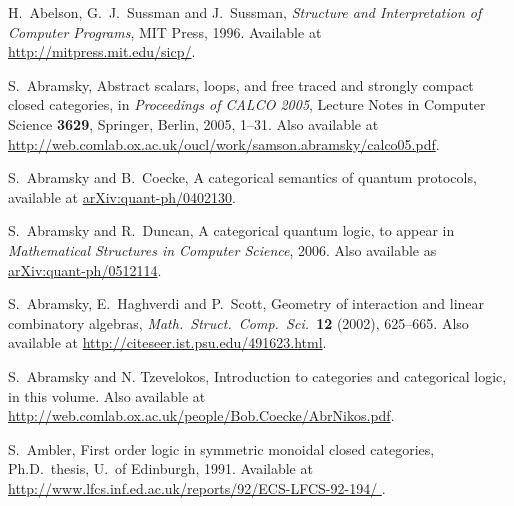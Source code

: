 \documentclass[12pt]{article}
\begin{document}
\begin{thebibliography}{99}
\raggedright
\newcommand{\quantph}[1]{\href{http://arxiv.org/abs/quant-ph/#1}{{ arXiv:quant-ph/#1}}}
\newcommand{\hepth}[1]{\href{http://arxiv.org/abs/hep-th/#1}{{ arXiv:hep-th/#1}}}
\newcommand{\grqc}[1]{\href{http://arxiv.org/abs/gr-qc/#1}{{ arXiv:gr-qc/#1}}}
\newcommand{\qalg}[1]{\href{http://arxiv.org/abs/q-alg/#1}{{ arXiv:q-alg/#1}}}
\newcommand{\mathph}[1]{\href{http://arxiv.org/abs/math-ph/#1}{{ arXiv:math-ph/#1}}}
\newcommand{\Math}[1]{\href{http://arxiv.org/abs/math/#1}{{ arXiv:math/#1}}}
\newcommand{\arxiv}[1]{\href{http://arxiv.org/abs/#1}{{ arXiv:#1}}}

 H.\ Abelson, G.\ J.\ Sussman and J.\
Sussman, {\sl Structure and Interpretation of Computer Programs},
MIT Press, 1996.  Available at \href{http://mitpress.mit.edu/sicp/}{{ http://mitpress.mit.edu/sicp/}}.

S.\ Abramsky, Abstract scalars, loops, and free traced and strongly 
compact closed categories, in {\sl Proceedings of CALCO 2005}, 
Lecture Notes in Computer Science {\bf 3629}, Springer, Berlin,
2005, 1--31. Also available at \hfill \break 
\href{http://web.comlab.ox.ac.uk/oucl/work/samson.abramsky/calco05.pdf}{ http://web.comlab.ox.ac.uk/oucl/work/samson.abramsky/calco05.pdf}.

 S.\ Abramsky and B.\ Coecke, A categorical semantics of
quantum protocols, available at \quantph{0402130}.

S.\ Abramsky and R.\ Duncan, A categorical quantum logic, to appear 
in {\sl Mathematical Structures in Computer Science}, 2006.
Also available as \quantph{0512114}.

 S.\ Abramsky, E.\ Haghverdi and P.\ Scott,
Geometry of interaction and linear combinatory algebras, 
{\sl Math.\ Struct.\ Comp.\ Sci.\ }{\bf 12} (2002), 625--665.  Also
available at \hfill \break
\href{http://citeseer.ist.psu.edu/491623.html}{ http://citeseer.ist.psu.edu/491623.html}.

 S.\ Abramsky and N. Tzevelokos, Introduction to categories
and categorical logic, in this volume.  Also available at
\href{http://web.comlab.ox.ac.uk/people/Bob.Coecke/AbrNikos.pdf}{ http://web.comlab.ox.ac.uk/people/Bob.Coecke/AbrNikos.pdf}.

 S.\ Ambler, First order logic in symmetric monoidal
closed categories, Ph.D.\ thesis, U.\ of Edinburgh, 1991.  
Available at 
\href{http://www.lfcs.inf.ed.ac.uk/reports/92/ECS-LFCS-92-194/}{http://www.lfcs.inf.ed.ac.uk/reports/92/ECS-LFCS-92-194/ }.


\end{thebibliography}
\end{document}
